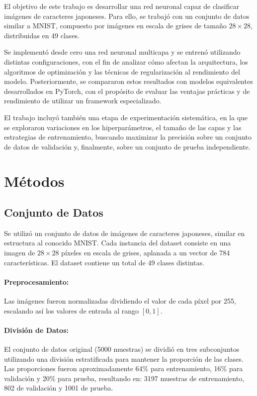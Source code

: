 \documentclass[11pt]{article}
\begin{document}
El objetivo de este trabajo es desarrollar una red neuronal capaz de clasificar imágenes de caracteres japoneses. Para ello, se trabajó con un conjunto de datos similar a MNIST, compuesto por imágenes en escala de grises de tamaño $28 \times 28$, distribuidas en 49 clases. 

Se implementó desde cero una red neuronal multicapa y se entrenó utilizando distintas configuraciones, con el fin de analizar cómo afectan la arquitectura, los algoritmos de optimización y las técnicas de regularización al rendimiento del modelo. Posteriormente, se compararon estos resultados con modelos equivalentes desarrollados en PyTorch, con el propósito de evaluar las ventajas prácticas y de rendimiento de utilizar un framework especializado.

El trabajo incluyó también una etapa de experimentación sistemática, en la que se exploraron variaciones en los hiperparámetros, el tamaño de las capas y las estrategias de entrenamiento, buscando maximizar la precisión sobre un conjunto de datos de validación y, finalmente, sobre un conjunto de prueba independiente.

\section{Métodos}

\subsection{Conjunto de Datos}
Se utilizó un conjunto de datos de imágenes de caracteres japoneses, similar en estructura al conocido MNIST. Cada instancia del dataset consiste en una imagen de $28 \times 28$ píxeles en escala de grises, aplanada a un vector de 784 características. El dataset contiene un total de 49 clases distintas.

\paragraph{Preprocesamiento:} Las imágenes fueron normalizadas dividiendo el valor de cada píxel por 255, escalando así los valores de entrada al rango $[0, 1]$.

\paragraph{División de Datos:} El conjunto de datos original (5000 muestras) se dividió en tres subconjuntos utilizando una división estratificada para mantener la proporción de las clases. Las proporciones fueron aproximadamente 64\% para entrenamiento, 16\% para validación y 20\% para prueba, resultando en: 3197 muestras de entrenamiento, 802 de validación y 1001 de prueba.
\end{document}

